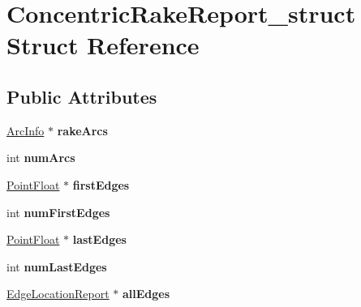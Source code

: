 \hypertarget{structConcentricRakeReport__struct}{
\section{ConcentricRakeReport\_\-struct Struct Reference}
\label{structConcentricRakeReport__struct}
}
\subsection*{Public Attributes}
\begin{DoxyCompactItemize}
\item 
\hypertarget{structConcentricRakeReport__struct_a723f997fe56b7a93acddb00c3aa9311a}{
\hyperlink{structArcInfo__struct}{ArcInfo} $\ast$ {\bfseries rakeArcs}}
\label{structConcentricRakeReport__struct_a723f997fe56b7a93acddb00c3aa9311a}

\item 
\hypertarget{structConcentricRakeReport__struct_a979134629fda4c2fb0860b474d77695d}{
int {\bfseries numArcs}}
\label{structConcentricRakeReport__struct_a979134629fda4c2fb0860b474d77695d}

\item 
\hypertarget{structConcentricRakeReport__struct_a3e64201cb06021e427ec27f90215449e}{
\hyperlink{structPointFloat__struct}{PointFloat} $\ast$ {\bfseries firstEdges}}
\label{structConcentricRakeReport__struct_a3e64201cb06021e427ec27f90215449e}

\item 
\hypertarget{structConcentricRakeReport__struct_abf8847c8d254aec4a667ff4f3ee1959d}{
int {\bfseries numFirstEdges}}
\label{structConcentricRakeReport__struct_abf8847c8d254aec4a667ff4f3ee1959d}

\item 
\hypertarget{structConcentricRakeReport__struct_ac3497d3011f06a69ecc01960accd6960}{
\hyperlink{structPointFloat__struct}{PointFloat} $\ast$ {\bfseries lastEdges}}
\label{structConcentricRakeReport__struct_ac3497d3011f06a69ecc01960accd6960}

\item 
\hypertarget{structConcentricRakeReport__struct_a3974e299682213de2f2af869a56f9283}{
int {\bfseries numLastEdges}}
\label{structConcentricRakeReport__struct_a3974e299682213de2f2af869a56f9283}

\item 
\hypertarget{structConcentricRakeReport__struct_a2aa4d28db561c961a4f4833878937659}{
\hyperlink{structEdgeLocationReport__struct}{EdgeLocationReport} $\ast$ {\bfseries allEdges}}
\label{structConcentricRakeReport__struct_a2aa4d28db561c961a4f4833878937659}


\end{DoxyCompactItemize}
